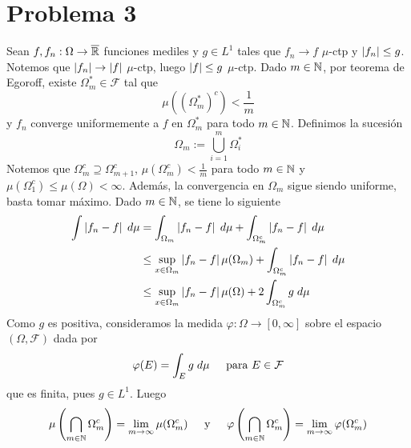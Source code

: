 \documentclass{article}
\begin{document}
\section*{Problema 3}
\noindent Sean $f,f_{n}:\Omega\to\overline{\mathbb{R}}$ funciones mediles y $g\in L^{1}$ tales que $f_{n}\to f$ 
$\mu$-ctp y $\left|f_{n} \right|\leq g$. Notemos que $\left|f_{n} \right|\to\left|f \right|$ $\mu$-ctp, luego 
$\left|f \right|\leq g$ $\mu$-ctp. Dado $m\in\mathbb{N}$, por teorema de Egoroff, existe $\Omega_{m}^{*}\in
\mathcal{F}$ tal que
\begin{equation*}
    \mu((\Omega_{m}^{*})^{c})<\frac{1}{m}
\end{equation*}
y $f_{n}$ converge uniformemente a $f$ en $\Omega_{m}^{*}$ para todo $m\in\mathbb{N}$. 
Definimos la sucesión
\begin{equation*}
    \Omega_{m}:=\bigcup_{i=1}^{m}\Omega_{i}^{*}
\end{equation*}
Notemos que $\Omega_{m}^{c}\supseteq\Omega_{m+1}^{c}$, $\mu(\Omega_{m}^{c})<\frac{1}{m}$ para todo 
$m\in\mathbb{N}$ y $\mu(\Omega_{1}^{c})\leq\mu(\Omega)<\infty$. Además, la convergencia en $\Omega_{m}$ 
sigue siendo uniforme, basta tomar máximo. Dado $m\in\mathbb{N}$, se tiene lo siguiente
\begin{align*}
    \int\left|f_{n}-f \right|\hspace{1mm}d\mu &= \int_{\Omega_{m}}\left|f_{n}-f \right|\hspace{1mm}d\mu+
    \int_{\Omega_{m}^{c}}\left|f_{n}-f \right|\hspace{1mm}d\mu \\
    &\leq \sup_{x\in\Omega_{m}}\left|f_{n}-f \right|\mu(\Omega_{m})
    +\int_{\Omega_{m}^{c}}\left|f_{n}-f \right|\hspace{1mm}d\mu \\
    &\leq \sup_{x\in\Omega_{m}}\left|f_{n}-f \right|\mu(\Omega)
    +2\int_{\Omega_{m}^{c}}g\hspace{1mm}d\mu
\end{align*}
Como $g$ es positiva, consideramos la medida $\varphi:\Omega\to[0,\infty]$ sobre el espacio 
$(\Omega, \mathcal{F})$ dada por
\begin{equation*}
    \varphi(E)=\int_{E}g\hspace{1mm}d\mu\hspace{4mm}\text{ para }E\in\mathcal{F}
\end{equation*}
que es finita, pues $g\in L^{1}$. Luego
\begin{equation*}
    \mu\left(\bigcap_{m\in\mathbb{N}}\Omega_{m}^{c}\right)=\lim\limits_{m\to\infty}\mu(\Omega_{m}^{c})
    \hspace{4mm}\text{ y }\hspace{4mm}
    \varphi\left(\bigcap_{m\in\mathbb{N}}\Omega_{m}^{c}\right)=\lim\limits_{m\to\infty}
    \varphi(\Omega_{m}^{c})
\end{equation*}
\end{document}

